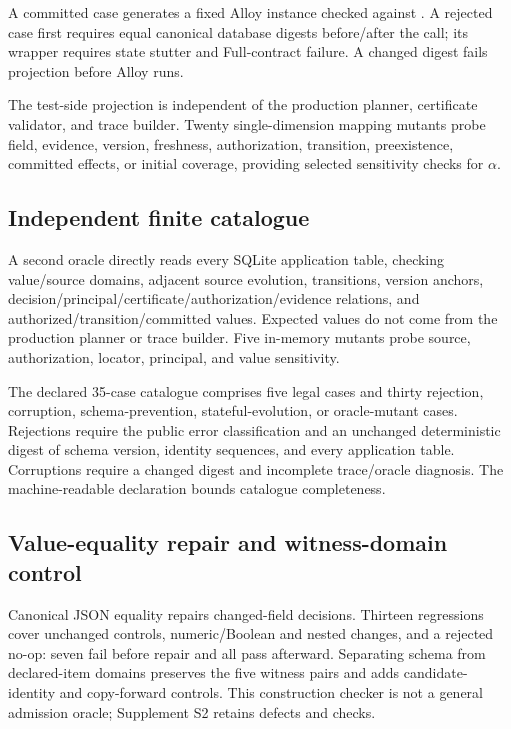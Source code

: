 A committed case generates a fixed Alloy instance checked against . A rejected case first requires equal canonical database digests before/after the call; its wrapper requires state stutter and Full-contract failure. A changed digest fails projection before Alloy runs.

The test-side projection is independent of the production planner, certificate validator, and trace builder. Twenty single-dimension mapping mutants probe field, evidence, version, freshness, authorization, transition, preexistence, committed effects, or initial coverage, providing selected sensitivity checks for $\alpha$.

\subsection{Independent finite catalogue}

A second oracle directly reads every SQLite application table, checking value/source domains, adjacent source evolution, transitions, version anchors, decision/principal/certificate/authorization/evidence relations, and authorized/transition/committed values. Expected values do not come from the production planner or trace builder. Five in-memory mutants probe source, authorization, locator, principal, and value sensitivity.

The declared 35-case catalogue comprises five legal cases and thirty rejection, corruption, schema-prevention, stateful-evolution, or oracle-mutant cases. Rejections require the public error classification and an unchanged deterministic digest of schema version, identity sequences, and every application table. Corruptions require a changed digest and incomplete trace/oracle diagnosis. The machine-readable declaration bounds catalogue completeness.

\subsection{Value-equality repair and witness-domain control}

Canonical JSON equality repairs changed-field decisions. Thirteen regressions cover unchanged controls, numeric/Boolean and nested changes, and a rejected no-op: seven fail before repair and all pass afterward. Separating schema from declared-item domains preserves the five witness pairs and adds candidate-identity and copy-forward controls. This construction checker is not a general admission oracle; Supplement S2 retains defects and checks.

